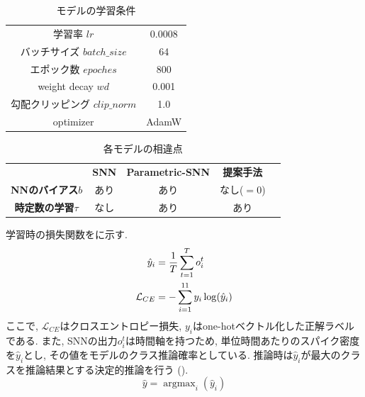 \begin{table}[htb]
    \centering
    \caption{モデルの学習条件}
    \label{tab:exp2:train:parameter}
    \begin{tabular}{cc}
        \hline
        学習率 $lr$ & 0.0008\\
        バッチサイズ $batch\_size$ & 64\\
        エポック数 $epoches$ & 800\\
        weight decay $wd$ & 0.001\\
        勾配クリッピング $clip\_norm$ & 1.0\\
        optimizer & AdamW\\
        \hline
    \end{tabular}
\end{table}


\begin{table}[htb]
    \centering
    \caption{各モデルの相違点}
    \label{tab:exp2:parameter}
    \begin{tabular}{ccccc}
        \hline
         & \textbf{SNN} & \textbf{Parametric-SNN} & \textbf{提案手法}\\
         \textbf{NNのバイアス$b$}&あり&あり&なし($=0$)\\
         \textbf{時定数の学習$\tau$}&なし&あり&あり\\
        \hline
    \end{tabular}
\end{table}

学習時の損失関数をに示す.
\begin{align}
    \hat{y}_i &= \frac{1}{T} \sum_{t=1}^T o_i^t \notag \\
    \mathcal{L}_{CE} &= -\sum_{i=1}^{11} y_i \log(\hat{y}_i) \label{eq:exp2:loss}
\end{align}
ここで, $\mathcal{L}_{CE}$はクロスエントロピー損失, $y_i$はone-hotベクトル化した正解ラベルである.
また, SNNの出力$o_i^t$は時間軸を持つため, 単位時間あたりのスパイク密度を$\hat{y}_i$とし, その値をモデルのクラス推論確率としている.
推論時は$\hat{y}_i$が最大のクラスを推論結果とする決定的推論を行う ().
\begin{equation}
\hat{y} = \mathop{\arg\max}_{i}(\hat{y}_i) \label{eq:exp2:inference}
\end{equation}



